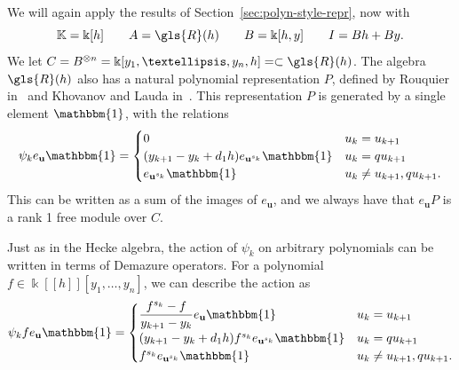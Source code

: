 \documentclass[10pt]{article}
\theoremstyle{definition}
\newcommand{\bone}{\mathbbm{1}}
\newcommand{\K}{\Bbbk}%
\newcommand{\Bu}{\mathbf{u}}
\newcommand\llbracket{[\![}
\newcommand\rrbracket{]\!]}
\begin{document}
 
We will again apply the results of Section~\ref{sec:polyn-style-repr},
now with 
\begin{equation}
\mathbb{K}=\K[h]\qquad A=\gls{R}(h)\qquad
 B=\K[h,y]\qquad I=Bh+By.\label{eq:KLR-PR}
\end{equation}
We let $C=B^{\otimes n}=\K[y_1,\dots,y_n,h]=\subset \gls{R}(h)$.
The algebra $\gls{R}(h)$ also has a natural polynomial representation $P$, defined
by Rouquier
in~\cite[\S~3.2]{Rou2KM} and Khovanov and Lauda in~\cite[\S~2.3]{KLI}.
 This representation $P$ is generated
by a single element $\bone$, with the relations
\[ \psi_ke_{\Bu}\bone=
\begin{cases}
 0 & u_k=u_{k+1}\\
 (y_{k+1}-y_k+d_1h)e_{\Bu^{s_k}}\bone & u_k=qu_{k+1}\\
 e_{\Bu^{s_k}}\bone & u_k\neq u_{k+1},qu_{k+1}.
\end{cases}
\]
This can be written as a sum of the images of $e_{\Bu}$, and we always
have that $e_{\Bu}P$ is a rank 1 free module over
$C$. 

Just as in the Hecke algebra, the action of $\psi_k$ on arbitrary
polynomials can be written in terms of Demazure operators. For a
polynomial $f\in \K\llbracket h\rrbracket [y_1,\dots, y_n]$, we can describe the action
as 
\begin{equation}
 \psi_k f e_{\Bu}\bone=
\begin{cases}
 \displaystyle \frac{f^{s_k}-f}{y_{k+1}-y_k} e_{\Bu}\bone& u_k=u_{k+1}\\
 (y_{k+1}-y_k+d_1h)f^{s_k}e_{\Bu^{s_k}}\bone & u_k=qu_{k+1}\\
 f^{s_k} e_{\Bu^{s_k}}\bone & u_k\neq u_{k+1},qu_{k+1}.
\end{cases}\label{eq:KLR-action}
\end{equation}
\end{document}
